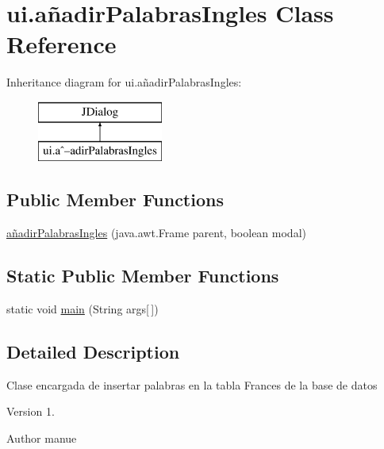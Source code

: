 \hypertarget{classui_1_1a_xC3_xB1adir_palabras_ingles}{}\section{ui.\+añadir\+Palabras\+Ingles Class Reference}
\label{classui_1_1a_xC3_xB1adir_palabras_ingles}
Inheritance diagram for ui.\+añadir\+Palabras\+Ingles\+:\begin{figure}[H]
\begin{center}
\leavevmode
\includegraphics[height=2.000000cm]{classui_1_1a_xC3_xB1adir_palabras_ingles}
\end{center}
\end{figure}
\subsection*{Public Member Functions}
\begin{DoxyCompactItemize}
\item 
\mbox{\hyperlink{classui_1_1a_xC3_xB1adir_palabras_ingles_a239f989cb1d4499f24fb08a33e253a3b}{añadir\+Palabras\+Ingles}} (java.\+awt.\+Frame parent, boolean modal)
\end{DoxyCompactItemize}
\subsection*{Static Public Member Functions}
\begin{DoxyCompactItemize}
\item 
static void \mbox{\hyperlink{classui_1_1a_xC3_xB1adir_palabras_ingles_ac0db1808f40d754978578112c0205f49}{main}} (String args\mbox{[}$\,$\mbox{]})
\end{DoxyCompactItemize}


\subsection{Detailed Description}
Clase encargada de insertar palabras en la tabla Frances de la base de datos \begin{DoxyVersion}{Version}
1. 
\end{DoxyVersion}
\begin{DoxyAuthor}{Author}
manue 
\end{DoxyAuthor}


